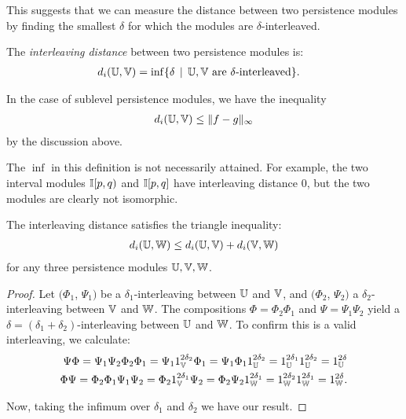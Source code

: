 This suggests that we can measure the distance between two persistence modules by finding the smallest $\delta$ for which the modules are $\delta$-interleaved.

\begin{definition}
\label{def-interleaving-distance}
The \emph{interleaving distance} between two persistence modules is:
\begin{align*}
d_i(\mathbb{U}, \mathbb{V}) &= \inf \{ \delta \, \mid \, \mathbb{U}, \mathbb{V} \text{ are } \delta\text{-interleaved} \}.
\end{align*}
\end{definition}

In the case of sublevel persistence modules, we have the inequality
\begin{align*}
d_i(\mathbb{U}, \mathbb{V}) \leq \Vert f - g \Vert_\infty
\end{align*}
by the discussion above.

The $\inf$ in this definition is not necessarily attained. For example, the two interval modules $\mathbb{I}[p, q)$ and $\mathbb{I}[p, q]$ have interleaving distance 0, but the two modules are clearly not isomorphic.

\begin{proposition}
The interleaving distance satisfies the triangle inequality:
\begin{align*}
d_i(\mathbb{U}, \mathbb{W}) \leq d_i(\mathbb{U}, \mathbb{V}) + d_i(\mathbb{V}, \mathbb{W})
\end{align*}
for any three persistence modules $\mathbb{U}, \mathbb{V}, \mathbb{W}$.
\end{proposition}
\begin{proof}
Let $(\Phi_1$, $\Psi_1)$ be a $\delta_1$-interleaving between $\mathbb{U}$ and $\mathbb{V}$, and $(\Phi_2$, $\Psi_2)$ a $\delta_2$-interleaving between $\mathbb{V}$ and $\mathbb{W}$. The compositions $\Phi = \Phi_2 \Phi_1$ and $\Psi = \Psi_1 \Psi_2$ yield a $\delta = (\delta_1 + \delta_2)$-interleaving between $\mathbb{U}$ and $\mathbb{W}$. To confirm this is a valid interleaving, we calculate:
\begin{align*}
\Psi \Phi = \Psi_1 \Psi_2 \Phi_2 \Phi_1 = \Psi_1 1_{\mathbb{V}}^{2\delta_2} \Phi_1 = \Psi_1 \Phi_1 1_{\mathbb{U}}^{2\delta_2} = 1_{\mathbb{U}}^{2\delta_1} 1_{\mathbb{U}}^{2\delta_2} = 1_{\mathbb{U}}^{2\delta} \\
\Phi \Psi = \Phi_2 \Phi_1 \Psi_1 \Psi_2  = \Phi_2 1_{\mathbb{V}}^{2\delta_1} \Psi_2 = \Phi_2 \Psi_2 1_{\mathbb{W}}^{2\delta_1} = 1_{\mathbb{W}}^{2\delta_2} 1_{\mathbb{W}}^{2\delta_1} = 1_{\mathbb{W}}^{2\delta}.
\end{align*} 

Now, taking the infimum over $\delta_1$ and $\delta_2$ we have our result.
\end{proof}

